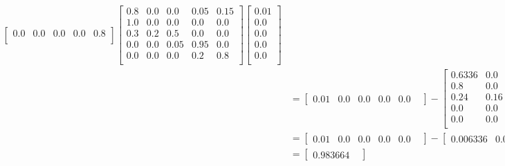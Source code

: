 \documentclass[11pt]{article}
\begin{document}
{\begin{enumerate}
\begin{align*}
\begin{bmatrix}
		0.0  & 0 .0 & 0.0 & 0.0 & 0.8 \\
		\end{bmatrix}
		\begin{bmatrix} 
		0.8  & 0.0 & 0.0 & 0.05 & 0.15 \\
		1.0  & 0.0 & 0.0 & 0.0   & 0.0 \\
		0.3  & 0.2 & 0.5 & 0.0 & 0.0 \\
		0.0  & 0.0 & 0.05 & 0.95 & 0.0 \\
		0.0  & 0.0 & 0.0 & 0.2 & 0.8 \\
		\end{bmatrix}
		\begin{bmatrix} 
		0.01 \\
		0.0 	\\
		0.0 	\\
		0.0 	\\
		0.0 	\\
		\end{bmatrix}\\
&=
		\begin{bmatrix} 
		0.01 &
		0.0 	&
		0.0 	&
		0.0 	&
		0.0 	&
		\end{bmatrix}
		 - 
		\begin{bmatrix} 
		0.6336  	& 0.0 		& 0.0 		& 0.0396 		& 0.1188 \\
		0.8  		& 0.0 		& 0.0 		&  0.0   		& 0.0 \\
		0.24  		& 0.16 	& 0.4 		& 0.0 			& 0.0 \\
		0.0  		& 0.0 		& 0.04 	& 0.76 		& 0.0 \\
		0.0  		& 0.0 		& 0.0 		& 0.16 		& 0.64 \\
		\end{bmatrix}
		\begin{bmatrix} 
		0.01 \\
		0.0 	\\
		0.0 	\\
		0.0 	\\
		0.0 	\\
		\end{bmatrix}\\
&=
		\begin{bmatrix} 
		0.01 &
		0.0 	&
		0.0 	&
		0.0 	&
		0.0 	&
		\end{bmatrix}
		 - 
		\begin{bmatrix} 
		0.006336    &
		0.008    	&
		0.0024 	&
		0.0 		&
		0.0 		&
		\end{bmatrix}\\
&=
		\begin{bmatrix} 
		0.983664    &

\end{bmatrix}
\end{align*}
\end{enumerate}}
\end{document}
